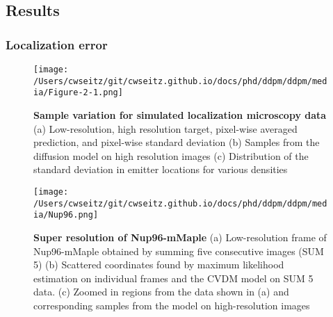 
\subsection{Results}

\subsubsection{Localization error}

\begin{figure}[t]
\centering
\texttt{[image: /Users/cwseitz/git/cwseitz.github.io/docs/phd/ddpm/ddpm/media/Figure-2-1.png]}
\caption{\textbf{Sample variation for simulated localization microscopy data} (a) Low-resolution, high resolution target, pixel-wise averaged prediction, and pixel-wise standard deviation (b) Samples from the diffusion model on high resolution images (c) Distribution of the standard deviation in emitter locations for various densities}
\label{fig:locobayes}
\end{figure}

\begin{figure}[t]
\centering
\texttt{[image: /Users/cwseitz/git/cwseitz.github.io/docs/phd/ddpm/ddpm/media/Nup96.png]}
\caption{\textbf{Super resolution of Nup96-mMaple} (a) Low-resolution frame of Nup96-mMaple obtained by summing five consecutive images (SUM 5) (b) Scattered coordinates found by maximum likelihood estimation on individual frames and the CVDM model on SUM 5 data. (c) Zoomed in regions from the data shown in (a) and corresponding samples from the model on high-resolution images}
\label{fig:nup96}
\end{figure}


